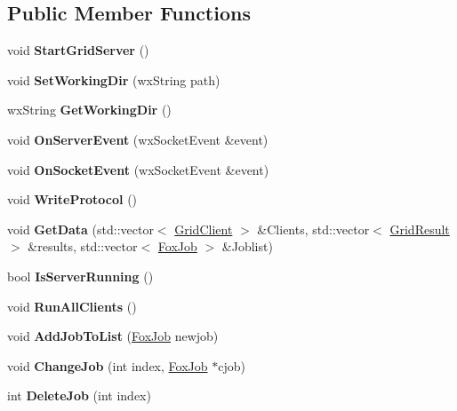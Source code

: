 \subsection*{Public Member Functions}
\begin{DoxyCompactItemize}
\item 
\mbox{\label{class_fox_server_a2dcab218b1ea353e23b3bdf53dbe2c0d}} 
void {\bfseries Start\+Grid\+Server} ()
\item 
\mbox{\label{class_fox_server_abc7a3f8d810bbdf3b2453bb9cf956977}} 
void {\bfseries Set\+Working\+Dir} (wx\+String path)
\item 
\mbox{\label{class_fox_server_ab2e373563b8f93305b56367d2d9da69d}} 
wx\+String {\bfseries Get\+Working\+Dir} ()
\item 
\mbox{\label{class_fox_server_a11b934b62bd4b78b978d614b9429991d}} 
void {\bfseries On\+Server\+Event} (wx\+Socket\+Event \&event)
\item 
\mbox{\label{class_fox_server_a37b7fcd5aaf913692a49c498006c294b}} 
void {\bfseries On\+Socket\+Event} (wx\+Socket\+Event \&event)
\item 
\mbox{\label{class_fox_server_a022f92cdfb23a9ae774baed8ce697fb9}} 
void {\bfseries Write\+Protocol} ()
\item 
\mbox{\label{class_fox_server_a51e57806f1d9da87052d2bfe9b0db7c4}} 
void {\bfseries Get\+Data} (std\+::vector$<$ \mbox{\hyperlink{class_grid_client}{Grid\+Client}} $>$ \&Clients, std\+::vector$<$ \mbox{\hyperlink{class_grid_result}{Grid\+Result}} $>$ \&results, std\+::vector$<$ \mbox{\hyperlink{class_fox_job}{Fox\+Job}} $>$ \&Joblist)
\item 
\mbox{\label{class_fox_server_a92d8c78deee842dada649b43d04ac074}} 
bool {\bfseries Is\+Server\+Running} ()
\item 
\mbox{\label{class_fox_server_a224627a667049881d5d4c352ada1b7b0}} 
void {\bfseries Run\+All\+Clients} ()
\item 
\mbox{\label{class_fox_server_a0a1f84a0bc1a37d639bb84444f9de657}} 
void {\bfseries Add\+Job\+To\+List} (\mbox{\hyperlink{class_fox_job}{Fox\+Job}} newjob)
\item 
\mbox{\label{class_fox_server_abc52b09e665830ce57fdd2a682092d06}} 
void {\bfseries Change\+Job} (int index, \mbox{\hyperlink{class_fox_job}{Fox\+Job}} $\ast$cjob)
\item 
\mbox{\label{class_fox_server_accc0dfab2951fa52c74af8bb38528e4c}} 
int {\bfseries Delete\+Job} (int index)
\end{DoxyCompactItemize}
